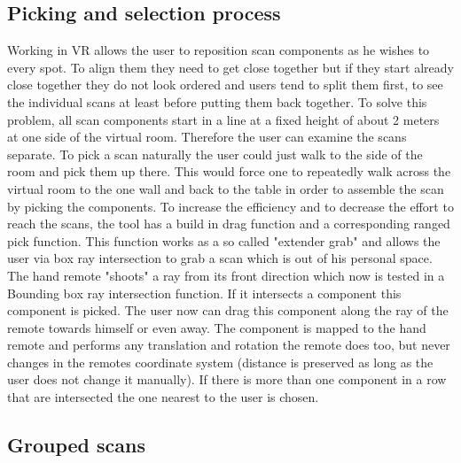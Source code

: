 \documentclass[hyperref,english,bachelorofscience,bibnum]{cgvpub}
\begin{document}
\subsection{Picking and selection process}

Working in VR allows the user to reposition scan components as he wishes to every spot. To align them they need to get close together but if they start already close together they do not look ordered and users tend to split them first, to see the individual scans at least before putting them back together. To solve this problem, all scan components start in a line at a fixed height of about 2 meters at one side of the virtual room. Therefore the user can examine the scans separate.
To pick a scan naturally the user could just walk to the side of the room and pick them up there. This would force one to repeatedly walk across the virtual room to the one wall and back to the table in order to assemble the scan by picking the components. To increase the efficiency and to decrease the effort to reach the scans, the tool has a build in drag function and a corresponding ranged pick function. This function works as a so called "extender grab"\cite{Jerald2015} %
and allows the user via box ray intersection to grab a scan which is out of his personal space.
The hand remote "shoots" a ray from its front direction which now is tested in a Bounding box ray intersection function. If it intersects a component this component is picked. The user now can drag this component along the ray of the remote towards himself or even away. The component is mapped to the hand remote and performs any translation and rotation the remote does too, but never changes in the remotes coordinate system (distance is preserved as long as the user does not change it manually).
If there is more than one component in a row that are intersected the one nearest to the user is chosen. 

\subsection{Grouped scans}
\end{document}
